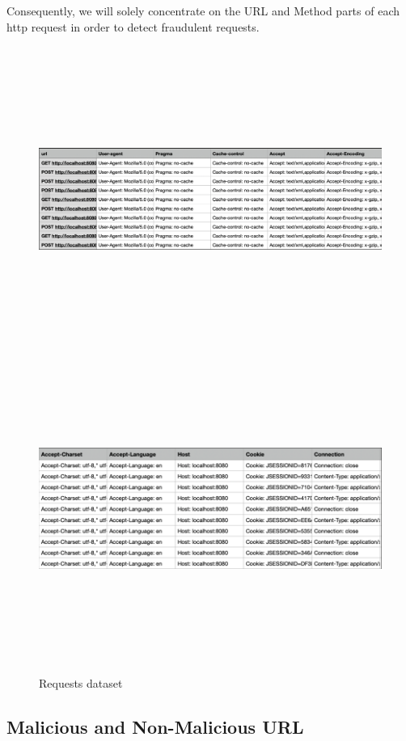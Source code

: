 Consequently, we will solely concentrate on the URL and Method parts of each http request in order to detect fraudulent requests.

\begin{figure}[!h]
	\centering
	\includegraphics[width=\linewidth, height=10cm,keepaspectratio]{figures/dataset part1.PNG}
	\includegraphics[width=\linewidth, height=10cm,keepaspectratio]{figures/dataset part2.PNG}
  \caption{Requests dataset}
\end{figure}

\newpage
\subsection{Malicious and Non-Malicious URL}

